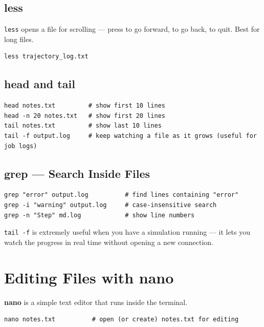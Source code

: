 \documentclass[12pt,a4paper]{article}
\newcommand{\tip}[1]{%
  \begin{tcolorbox}[tipstyle]
    #1
  \end{tcolorbox}
}
\newcommand{\cmd}[1]{\texttt{\textcolor{kugreen!70!black}{#1}}}
\newcommand{\key}[1]{\fbox{\small\ttfamily #1}}
\begin{document}
\subsection{less}

\cmd{less} opens a file for scrolling --- press \key{Space} to go forward,
\key{b} to go back, \key{q} to quit. Best for long files.

\begin{lstlisting}[style=bash]
less trajectory_log.txt
\end{lstlisting}

\subsection{head and tail}

\begin{lstlisting}[style=bash]
head notes.txt         # show first 10 lines
head -n 20 notes.txt   # show first 20 lines
tail notes.txt         # show last 10 lines
tail -f output.log     # keep watching a file as it grows (useful for job logs)
\end{lstlisting}

\subsection{grep --- Search Inside Files}

\begin{lstlisting}[style=bash]
grep "error" output.log          # find lines containing "error"
grep -i "warning" output.log     # case-insensitive search
grep -n "Step" md.log            # show line numbers
\end{lstlisting}

\tip{
  \cmd{tail -f} is extremely useful when you have a simulation running --- it
  lets you watch the progress in real time without opening a new connection.
}

\section{Editing Files with nano}

\textbf{nano} is a simple text editor that runs inside the terminal.

\begin{lstlisting}[style=bash]
nano notes.txt          # open (or create) notes.txt for editing
\end{lstlisting}
\end{document}
